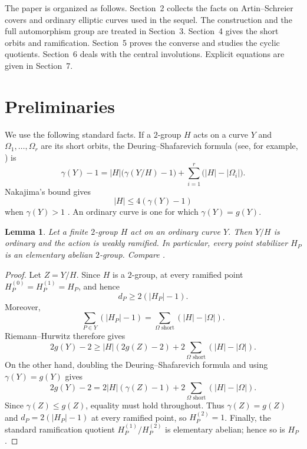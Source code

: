 \documentclass[11pt]{article}
\newtheorem{lemma}[theorem]{Lemma}
\theoremstyle{remark}
\begin{document}
The paper is organized as follows.  Section~2 collects the facts on
Artin--Schreier covers and ordinary elliptic curves used in the sequel.
The construction and the full automorphism group are treated in
Section~3.  Section~4 gives the short orbits and ramification.
Section~5 proves the converse and studies the cyclic quotients.
Section~6 deals with the central involutions.  Explicit equations are
given in Section~7.


\section{Preliminaries}\label{sec:prelim}

We use the following standard facts.  If a $2$-group $H$ acts on a curve
$Y$ and $\Omega_1,\ldots,\Omega_r$ are its short orbits, the
Deuring--Shafarevich formula (see, for example, \cite{Subrao,NakajimaDS}) is
\begin{equation}\label{eq:DS}
 \gamma(Y)-1
 =|H|\bigl(\gamma(Y/H)-1\bigr)
  +\sum_{i=1}^r\bigl(|H|-|\Omega_i|\bigr).
\end{equation}
Nakajima's bound gives
\begin{equation}\label{eq:Nakajima}
        |H|\le4(\gamma(Y)-1)
\end{equation}
when $\gamma(Y)>1$ \cite[Theorem~1]{Nakajima}.  An ordinary curve is one for which
$\gamma(Y)=g(Y)$.

\begin{lemma}\label{lem:ordinary-weak}
Let a finite $2$-group $H$ act on an ordinary curve $Y$.  Then $Y/H$ is
ordinary and the action is weakly ramified.  In particular, every point
stabilizer $H_P$ is an elementary abelian $2$-group.  Compare
\cite{NakajimaDS}.
\end{lemma}

\begin{proof}
Let $Z=Y/H$.  Since $H$ is a $2$-group, at every ramified point
$H_P^{(0)}=H_P^{(1)}=H_P$, and hence
\[
 d_P\ge 2(|H_P|-1).
\]
Moreover,
\[
 \sum_{P\in Y}(|H_P|-1)
 =\sum_{\Omega\text{ short}}(|H|-|\Omega|).
\]
Riemann--Hurwitz therefore gives
\[
 2g(Y)-2\ge |H|(2g(Z)-2)
 +2\sum_{\Omega\text{ short}}(|H|-|\Omega|).
\]
On the other hand, doubling the Deuring--Shafarevich formula and using
$\gamma(Y)=g(Y)$ gives
\[
 2g(Y)-2=2|H|(\gamma(Z)-1)
 +2\sum_{\Omega\text{ short}}(|H|-|\Omega|).
\]
Since $\gamma(Z)\le g(Z)$, equality must hold throughout.  Thus
$\gamma(Z)=g(Z)$ and $d_P=2(|H_P|-1)$ at every ramified point, so
$H_P^{(2)}=1$.  Finally, the standard ramification quotient
$H_P^{(1)}/H_P^{(2)}$ is elementary abelian; hence so is $H_P$.
\end{proof}
\end{document}
